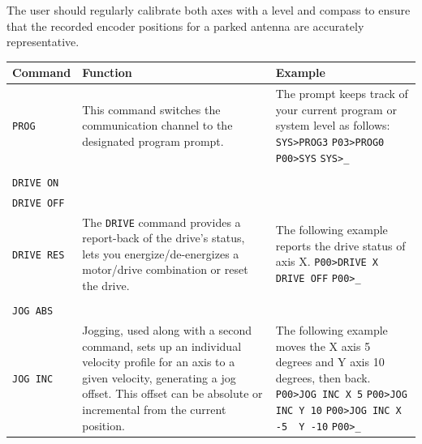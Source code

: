 \documentclass[titlepage]{article}
\begin{document}
The user should regularly calibrate both axes with a level and compass to ensure that the recorded encoder positions for a parked antenna are accurately representative.

\begin{table}
  \begin{center}
    \begin{tabularx}{\linewidth}{l|>{\raggedright\arraybackslash}X|>{\raggedright\arraybackslash}X}
      Command          & Function & Example \\ \hline

      \lstinline|PROG| &
      This command switches the communication channel to the designated
      program prompt. &
      The prompt keeps track of your current program or system level as follows: \newline
      \lstinline|SYS>PROG3| \newline
      \lstinline|P03>PROG0| \newline
      \lstinline|P00>SYS| \newline
      \lstinline|SYS>_|
      \\ \hline

      \makecell[lt]{
        \lstinline|DRIVE| \\
        \lstinline|DRIVE ON| \\
        \lstinline|DRIVE OFF| \\
        \lstinline|DRIVE RES|
      } &
      The \lstinline|DRIVE| command provides a report-back of the drive's status, lets you
      energize/de-energizes a motor/drive combination or reset the drive. &
      The following example reports the drive status of axis X. \newline
      \lstinline|P00>DRIVE X| \newline
      \lstinline|DRIVE OFF| \newline
      \lstinline|P00>_|
      \\ \hline

      \makecell[lt]{
        \lstinline|JOG| \\
        \lstinline|JOG ABS| \\
        \lstinline|JOG INC|
      } &
      Jogging, used along with a second command, sets up an individual velocity profile for an axis to a given velocity, generating a jog offset. This offset can be absolute or incremental from the current position. &
      The following example moves the X axis 5 degrees and Y axis 10 degrees, then back. \newline
      \lstinline|P00>JOG INC X 5| \newline
      \lstinline|P00>JOG INC Y 10| \newline
      \lstinline|P00>JOG INC X -5  Y -10| \newline
      \lstinline|P00>_|
      \\ \hline


\end{tabularx}
\end{center}
\end{table}
\end{document}
